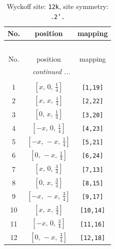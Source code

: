 \documentclass[fleqn,8pt]{jsarticle}
\begin{document}
\begin{longtable}{ccc}
\caption{Wyckoff site: {\tt 12k}, site symmetry: {\tt .2'.}}
 \\
 \hline \hline
No. & position & mapping \\ \hline \endfirsthead

\multicolumn{2}{l}{\tablename\ \thetable{}} \\
 \hline \hline
No. & position & mapping \\ \hline \endhead

 \hline \hline
\multicolumn{2}{r}{\footnotesize\it continued ...} \\ \endfoot

 \hline \hline
\multicolumn{2}{r}{} \\ \endlastfoot

1 & $\left[ x,\, 0,\, \frac{1}{4} \right]$ & {\tt [1,19]} \\ \hline
2 & $\left[ x,\, x,\, \frac{1}{4} \right]$ & {\tt [2,22]} \\ \hline
3 & $\left[ 0,\, x,\, \frac{1}{4} \right]$ & {\tt [3,20]} \\ \hline
4 & $\left[ - x,\, 0,\, \frac{1}{4} \right]$ & {\tt [4,23]} \\ \hline
5 & $\left[ - x,\, - x,\, \frac{1}{4} \right]$ & {\tt [5,21]} \\ \hline
6 & $\left[ 0,\, - x,\, \frac{1}{4} \right]$ & {\tt [6,24]} \\ \hline
7 & $\left[ x,\, 0,\, \frac{3}{4} \right]$ & {\tt [7,13]} \\ \hline
8 & $\left[ 0,\, x,\, \frac{3}{4} \right]$ & {\tt [8,15]} \\ \hline
9 & $\left[ - x,\, - x,\, \frac{3}{4} \right]$ & {\tt [9,17]} \\ \hline
10 & $\left[ x,\, x,\, \frac{3}{4} \right]$ & {\tt [10,14]} \\ \hline
11 & $\left[ - x,\, 0,\, \frac{3}{4} \right]$ & {\tt [11,16]} \\ \hline
12 & $\left[ 0,\, - x,\, \frac{3}{4} \right]$ & {\tt [12,18]} \\
\end{longtable}
\renewcommand{\arraystretch}{1.2}
\end{document}
